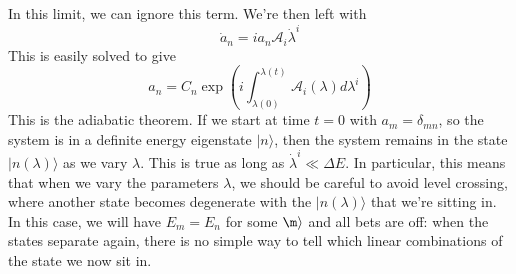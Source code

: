 In this limit, we can ignore this term. We're then left with
\[\dot{a}_n = ia_n\mathcal{A}_i \dot{\lambda}^i\]
This is easily solved to give
\[a_n = C_n \exp \left(i \int_{\lambda(0)}^{\lambda(t)}  \mathcal{A}_i(\lambda) d\lambda^i \right)\]
This is the adiabatic theorem. If we start at time $t = 0$ with $a_m = \delta_{mn}$, so the system is in a definite energy eigenstate $|n\rangle$, then the system remains in the state $|n(\lambda)\rangle$ as we vary $\lambda$. 
This is true as long as $\dot{\lambda}^i \ll \Delta E$.
In particular, this means that when we vary the parameters $\lambda$, we should be careful to avoid level crossing, where another state becomes degenerate with the $|n(\lambda)\rangle$ that we're sitting in. 
In this case, we will have $E_m = E_n$ for some $\m\rangle$ and all bets are off: when the states separate again, there is no simple way to tell which linear combinations of the state we now sit in.

